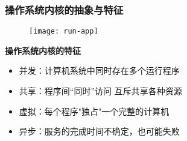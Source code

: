 \begin{frame}[plain]
    \frametitle{操作系统内核的抽象与特征}
    \begin{figure}
        \centering
        \texttt{[image: run-app]}
    \end{figure} %
    \textbf{操作系统内核的特征}
    \begin{itemize}
        \item 并发：计算机系统中同时存在多个运行程序 %
        \item 共享：程序间“同时”访问 互斥共享各种资源 %
        \item 虚拟：每个程序"独占"一个完整的计算机 %
        \item 异步：服务的完成时间不确定，也可能失败
    \end{itemize}
    
\end{frame}


